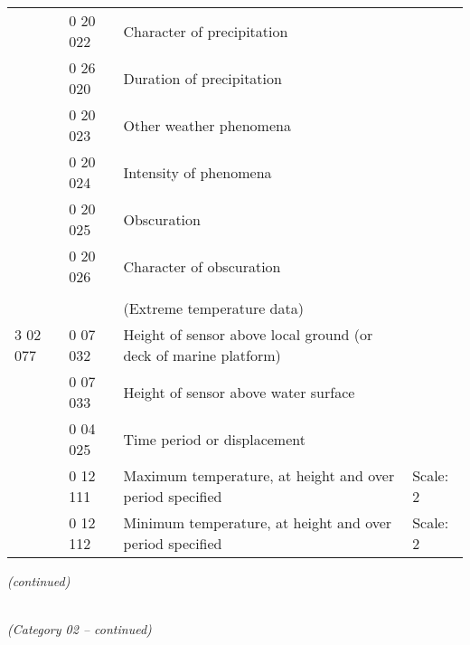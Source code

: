 \begin{longtable}[]{@{}llll@{}}
& 0 20 022 & Character of precipitation &\tabularnewline
& 0 26 020 & Duration of precipitation &\tabularnewline
& 0 20 023 & Other weather phenomena &\tabularnewline
& 0 20 024 & Intensity of phenomena &\tabularnewline
& 0 20 025 & Obscuration &\tabularnewline
& 0 20 026 & Character of obscuration &\tabularnewline
& & &\tabularnewline
& & (Extreme temperature data) &\tabularnewline
3 02 077 & 0 07 032 & Height of sensor above local ground (or deck of marine platform) &\tabularnewline
& 0 07 033 & Height of sensor above water surface &\tabularnewline
& 0 04 025 & Time period or displacement &\tabularnewline
& 0 12 111 & Maximum temperature, at height and over period specified & Scale: 2\tabularnewline
& 0 12 112 & Minimum temperature, at height and over period specified & Scale: 2\tabularnewline
\bottomrule
\end{longtable}

\emph{(continued)}

\emph{\\
(Category 02 -- continued)}

